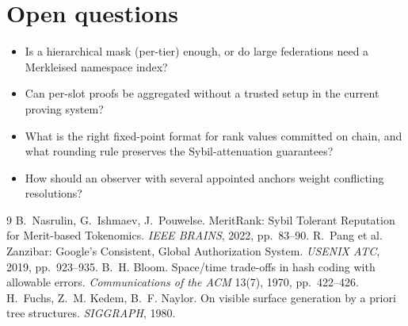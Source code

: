 \documentclass[a4paper,11pt,twoside,parskip=half-,headings=small]{scrartcl}
\begin{document}
\section{Open questions}
\label{sec:open}
\begin{itemize}
  \item Is a hierarchical mask (per-tier) enough, or do large federations need a Merkleised namespace index?
  \item Can per-slot proofs be aggregated without a trusted setup in the current proving system?
  \item What is the right fixed-point format for rank values committed on chain, and what rounding rule preserves the Sybil-attenuation guarantees?
  \item How should an observer with several appointed anchors weight conflicting resolutions?
\end{itemize}

\begin{thebibliography}{9}
 B.~Nasrulin, G.~Ishmaev, J.~Pouwelse. MeritRank: Sybil Tolerant Reputation for Merit-based Tokenomics. \emph{IEEE BRAINS}, 2022, pp.~83--90.
 R.~Pang et al. Zanzibar: Google's Consistent, Global Authorization System. \emph{USENIX ATC}, 2019, pp.~923--935.
 B.~H. Bloom. Space/time trade-offs in hash coding with allowable errors. \emph{Communications of the ACM} 13(7), 1970, pp.~422--426.
 H.~Fuchs, Z.~M. Kedem, B.~F. Naylor. On visible surface generation by a priori tree structures. \emph{SIGGRAPH}, 1980.
\end{thebibliography}
\end{document}

